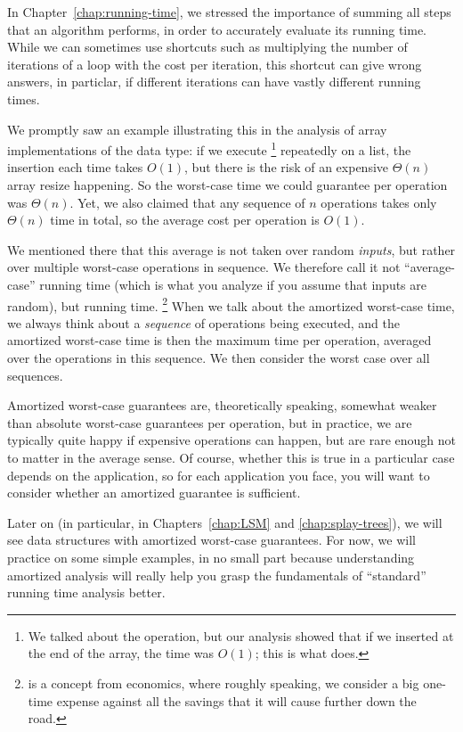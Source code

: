 In Chapter~\ref{chap:running-time}, we stressed the importance of
summing all steps that an algorithm performs, in order to accurately
evaluate its running time.
While we can sometimes use shortcuts such as multiplying the number of
iterations of a loop with the cost per iteration,
this shortcut can give wrong answers, in particlar,
if different iterations can have vastly different running times.

We promptly saw an example illustrating this in the analysis of array
implementations of the  data type:
if we execute %
\footnote{We talked about the  operation,
  but our analysis showed that if we inserted at the end of the array,
  the time was $O(1)$; this is what  does.}
repeatedly on a list, the insertion each time takes $O(1)$,
but there is the risk of an expensive $\Theta(n)$ array resize happening.
So the worst-case time we could guarantee per 
operation was $\Theta(n)$.
Yet, we also claimed that any sequence of $n$ 
operations takes only $\Theta(n)$ time in total,
so the average cost per operation is $O(1)$.

We mentioned there that this average is not taken over random \emph{inputs},
but rather over multiple worst-case operations in sequence.
We therefore call it not ``average-case'' running time
(which is what you analyze if you assume that inputs are random),
but  running time.%
\footnote{ is a concept from economics, where
  roughly speaking, we consider a big one-time expense against all the
  savings that it will cause further down the road.}
When we talk about the amortized worst-case time,
we always think about a \emph{sequence} of operations being executed,
and the amortized worst-case time is then the maximum time per operation,
averaged over the operations in this sequence.
We then consider the worst case over all sequences. 

Amortized worst-case guarantees are, theoretically speaking,
somewhat weaker than absolute worst-case guarantees per operation,
but in practice, we are typically quite happy if expensive operations
can happen, but are rare enough not to matter in the average sense.
Of course, whether this is true in a particular case depends on the
application, so for each application you face,
you will want to consider whether an amortized guarantee is sufficient.

Later on (in particular, in Chapters~\ref{chap:LSM} and
\ref{chap:splay-trees}),
we will see data structures with amortized worst-case guarantees.
For now, we will practice on some simple examples,
in no small part because understanding amortized analysis will really
help you grasp the fundamentals of ``standard'' running time analysis better.

